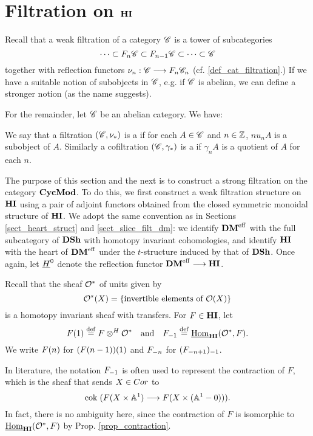 \newpage
\section{Filtration on $\HI$}\label{sect_filtration_hi}

Recall that a weak filtration of a category $\Cat{C}$ is a tower 
of subcategories
\[
\cdots \subset F_n\Cat{C} \subset F_{n - 1}\Cat{C} \subset \cdots 
   \subset \Cat{C}
\]
together with reflection functors $\nu_n : \Cat{C} \to F_n\Cat{C}_n$
(cf. \ref{def_cat_filtration}.) If we have a suitable notion of
subobjects in $\Cat{C}$, e.g. if $\Cat{C}$ is abelian, we can 
define a stronger notion (as the name suggests).

For the remainder, let $\Cat{C}$ be an abelian category. We have:

\begin{defn}
We say that a filtration $(\Cat{C}, \nu_*)$ is a  if for each $A \in \Cat{C}$ and $n \in \Z$, $nu_n A$ is 
a subobject of $A$. Similarly a cofiltration $(\Cat{C}, \gamma_*)$ 
is a  if $\gamma_n A$ is a quotient of 
$A$ for each $n$.
\end{defn}

The purpose of this section and the next is to construct a 
strong filtration on the category $\CycMod$. To do this, we first
construct a weak filtration structure on $\HI$ using a pair
of adjoint functors obtained from the closed symmetric monoidal 
structure of $\HI$. We adopt the same convention as in Sections
\ref{sect_heart_struct} and \ref{sect_slice_filt_dm}: we identify 
$\DMeff$ with the full subcategory of $\DSh$ with homotopy 
invariant cohomologies, and identify $\HI$ with the heart of 
$\DMeff$ under the $t$-structure induced by that of $\DSh$. Once
again, let $\sheaf{H}^0$ denote the reflection functor $\DMeff
\to \HI$.

Recall that the sheaf $\Ox$ of units given by 
\[
\Ox(X) = \{\textrm{invertible elements of }\O(X)\}
\]
is a homotopy invariant sheaf with transfers. For $F \in \HI$, 
let
\[
\LHI{F} \defeq F \tHI \Ox \hspace{10pt} \textrm{and}\hspace{10pt} 
   \RHI{F} \defeq \ihomHI(\Ox, F).  
\]
We write $\LHI[n]{F}$ for $\LHI{(\LHI[n - 1]{F})}$ and 
$\RHI[n]{F}$ for $\RHI{(\RHI[n + 1]{F})}$.

\begin{rmk}\label{rmk_contract_rhi_eq}
In literature, the notation $\RHI{F}$ is often used to represent
the contraction of $F$, which is the sheaf that sends $X \in 
\Cor$ to 
\[
\cok( F(X \times \A^1) \to F(X \times (\A^1 - 0))).
\]
In fact, there is no ambiguity here, since the contraction of
$F$ is isomorphic to $\ihomHI(\Ox, F)$ by Prop. 
\ref{prop_contraction}.
\end{rmk}

